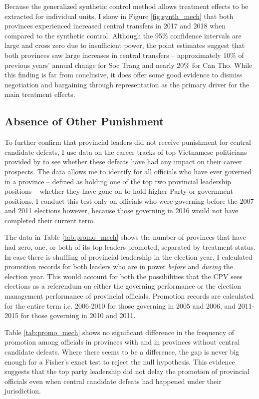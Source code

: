 \documentclass[12pt]{article}
\newcommand{\1}{\mathbbm{1}}
\begin{document}
Because the generalized synthetic control method allows treatment effects to be extracted for individual units, I show in Figure \ref{fig:synth_mech} that both provinces experienced increased central transfers in 2017 and 2018 when compared to the synthetic control. Although the 95\% confidence intervals are large and cross zero due to insufficient power, the point estimates suggest that both provinces saw large increases in central transfers -- approximately 10\% of previous years' annual change for Soc Trang and nearly 20\% for Can Tho. While this finding is far from conclusive, it does offer some good evidence to dismiss negotiation and bargaining through representation as the primary driver for the main treatment effects.

\subsection{Absence of Other Punishment}

To further confirm that provincial leaders did not receive punishment for central candidate defeats, I use data on the career tracks of top Vietnamese politicians provided by \citet{MaleskyPhan2017} to see whether these defeats have had any impact on their career prospects. The data allows me to identify for all officials who have ever governed in a province -- defined as holding one of the top two provincial leadership positions -- whether they have gone on to hold higher Party or government positions. I conduct this test only on officials who were governing before the 2007 and 2011 elections however, because those governing in 2016 would not have completed their current term.

The data in Table \ref{tab:promo_mech} shows the number of provinces that have had zero, one, or both of its top leaders promoted, separated by treatment status. In case there is shuffling of provincial leadership in the election year, I calculated promotion records for both leaders who are in power \textit{before} and \textit{during} the election year. This would account for both the possibilities that the CPV sees elections as a referendum on either the governing performance or the election management performance of provincial officials. Promotion records are calculated for the entire term i.e. 2006-2010 for those governing in 2005 and 2006, and 2011-2015 for those governing in 2010 and 2011.



Table \ref{tab:promo_mech} shows no significant difference in the frequency of promotion among officials in provinces with and in provinces without central candidate defeats. Where there seems to be a difference, the gap is never big enough for a Fisher's exact test to reject the null hypothesis. This evidence suggests that the top party leadership did not delay the promotion of provincial officials even when central candidate defeats had happened under their jurisdiction.
\end{document}
